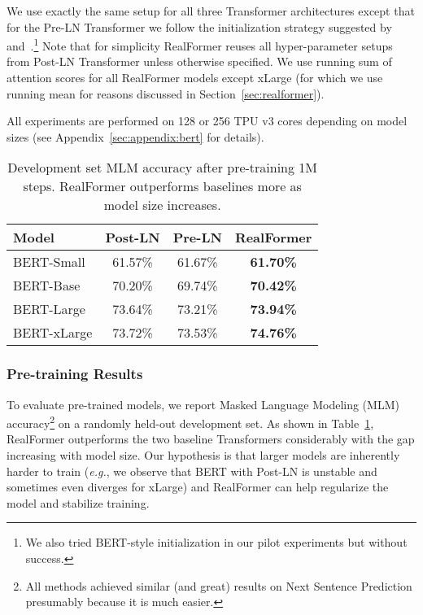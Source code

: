 \documentclass[11pt,a4paper]{article}
\begin{document}
We use exactly the same setup for all three Transformer architectures except that for the Pre-LN Transformer we follow the initialization strategy suggested by~\citet{Radford-2019-gpt2} and~\citet{Child-2019-sparsetransformer}.\footnote{We also tried BERT-style initialization in our pilot experiments but without success.} Note that for simplicity RealFormer reuses all hyper-parameter setups from Post-LN Transformer unless otherwise specified.
We use running sum of attention scores for all RealFormer models except xLarge (for which we use running mean for reasons discussed in Section~\ref{sec:realformer}).

All experiments are performed on 128 or 256 TPU v3 cores depending on model sizes (see Appendix~\ref{sec:appendix:bert} for details). 


\begin{table}
\setlength{\tabcolsep}{3.5pt}
\centering
\begin{tabular}{l|ccc}
\hline \textbf{Model} & \textbf{Post-LN} & \textbf{Pre-LN} & \textbf{RealFormer} \\ \hline
BERT-Small  & 61.57\%  & 61.67\%   & \textbf{61.70\%}  \\
BERT-Base   & 70.20\%  & 69.74\%   & \textbf{70.42\%}  \\
BERT-Large  & 73.64\%  & 73.21\%   & \textbf{73.94\%}  \\
BERT-xLarge & 73.72\%  & 73.53\%   & \textbf{74.76\%}  \\
\hline
\end{tabular}
\caption{Development set MLM accuracy after pre-training 1M steps. RealFormer outperforms baselines more as model size increases.}
\label{table:bert-mlm}
\end{table}


\subsubsection{Pre-training Results} \label{sec:pre-train}
To evaluate pre-trained models, we report Masked Language Modeling (MLM) accuracy\footnote{All methods achieved similar (and great) results on Next Sentence Prediction presumably because it is much easier.} on a randomly held-out development set. As shown in Table~\ref{table:bert-mlm}, RealFormer outperforms the two baseline Transformers considerably with the gap increasing with model size. 
Our hypothesis is that larger models are inherently harder to train (\emph{e.g.}, we observe that BERT with Post-LN is unstable and sometimes even diverges for xLarge) and RealFormer can help regularize the model and stabilize training. 
\end{document}

